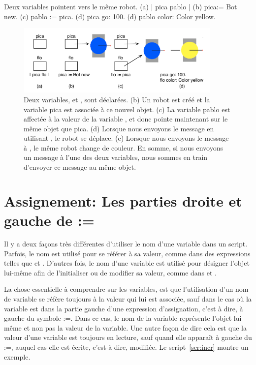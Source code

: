\documentclass[a4paper,10pt,twoside]{book}
\begin{document}
\begin{script}{Deux variables pointent vers le m\^eme robot. }
	(a)  | pica pablo |          
	(b)  pica:= Bot new. 
	(c)  pablo := pica. 
	(d)  pica go: 100. 
	(d)  pablo color: Color yellow.
\end{script}

\begin{figure}
\begin{center}
\centerline{\includegraphics[width=10cm]{boxesPointer}}
\caption{Deux variables,  et , sont d\'eclar\'ees. (b) Un robot est cr\'e\'e et la variable pica est associ\'ee \`a ce nouvel objet. (c) La variable pablo est affect\'ee \`a la valeur de la variable , et donc  pointe maintenant sur  le m\^eme objet que pica. (d) Lorsque nous envoyons le message  en utilisant , le robot se d\'eplace. (e) Lorsque nous envoyons le message  \`a , le m\^eme robot change de couleur. En somme, si nous envoyons un message \`a l'une des deux variables, nous sommes en train d'envoyer ce message au m\^eme objet. \label{fig:boxesPointerRepresentation}}
\end{center}
\end{figure}

\section*{Assignement: Les parties droite et gauche de := }

Il y a deux fa\c cons tr\`es diff\'erentes d'utiliser le nom d'une variable dans un script. Parfois, le nom est utilis\'e pour se r\'ef\'erer \`a sa valeur, comme dans des expressions telles que  et . D'autres fois, le nom d'une variable est utilis\'e pour d\'esigner l'objet lui-m\^eme afin de l'initialiser ou de modifier sa valeur, comme dans  et . 

La chose essentielle \`a comprendre sur les variables, est que l'utilisation d'un nom de variable se r\'ef\`ere toujours \`a la valeur qui lui est associ\'ee, sauf dans le cas o\`u la variable est dans la partie gauche d'une expression d'assignation, c'est \`a dire, \`a gauche du symbole :=. Dans ce cas, le nom de la variable repr\'esente l'objet lui-m\^eme et non pas la valeur de la variable. Une autre fa\c con de dire cela est que la valeur d'une variable est toujours en lecture, sauf quand elle appara\^it \`a gauche du :=, auquel cas elle est \'ecrite, c'est-\`a dire, modifi\'ee. Le script~\ref{scr:incr} montre un exemple. 
\end{document}
